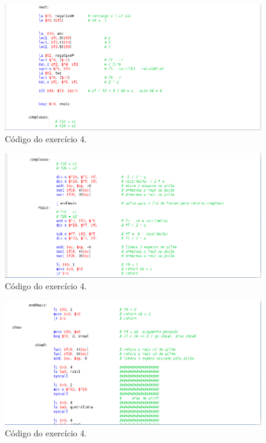 \documentclass[12pt]{article}
\begin{document}
\begin{figure}[H]
	\centering
	\includegraphics[width=1\textwidth]{EX_4_6.png}
	\caption{Código do exercício 4.}
	\label{fig:hilo6}
\end{figure}

\begin{figure}[H]
	\centering
	\includegraphics[width=1\textwidth]{EX_4_7.png}
	\caption{Código do exercício 4.}
	\label{fig:hilo7}
\end{figure}

\begin{figure}[H]
	\centering
	\includegraphics[width=1\textwidth]{EX_4_8.png}
	\caption{Código do exercício 4.}
	\label{fig:hilo8}
\end{figure}
\end{document}
